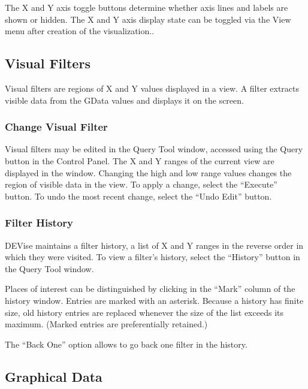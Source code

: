 The X and Y axis toggle buttons determine whether axis lines and labels are
shown or hidden. The X and Y axis display state can be toggled via the View menu
after creation of the visualization..


\subsection{Visual Filters}

Visual filters are regions of X and Y values displayed in a view. A filter
extracts visible data from the GData values and displays it on the screen.

\subsubsection{Change Visual Filter}

Visual filters may be edited in the Query Tool window, accessed using the Query
button in the Control Panel. The X and Y ranges of the current view are
displayed in the window. Changing the high and low range values changes the
region of visible data in the view. To apply a change, select the ``Execute''
button. To undo the most recent change, select the ``Undo Edit'' button.

\subsubsection{Filter History}

DEVise maintains a filter history, a list of X and Y ranges in the reverse order
in which they were visited. To view a filter's history, select the ``History'' button in the Query Tool window.

Places of interest can be distinguished by clicking in the ``Mark'' column of
the history window. Entries are marked with an asterisk.  Because a history has
finite size, old history entries are replaced whenever the size of the list
exceeds its maximum. (Marked entries are preferentially retained.)

The ``Back One'' option allows to go back one filter in the history.


\subsection{Graphical Data}

